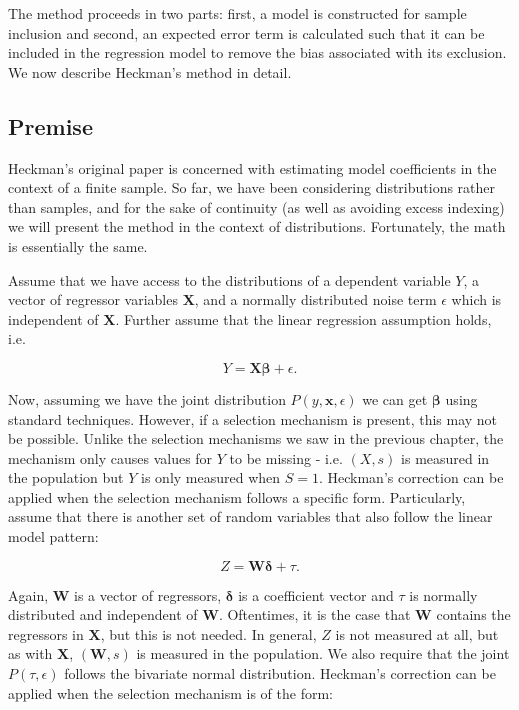 \documentclass[12pt,twoside]{reedthesis}
\theoremstyle{definition}
\begin{document}
The method proceeds in two parts: first, a model is constructed for sample inclusion and second, an expected error term is calculated such that it can be included in the regression model to remove the bias associated with its exclusion. We now describe Heckman's method in detail.

\subsection{Premise}

Heckman's original paper is concerned with estimating model coefficients in the context of a finite sample. So far, we have been considering distributions rather than samples, and for the sake of continuity (as well as avoiding excess indexing) we will present the method in the context of distributions. Fortunately, the math is essentially the same.

Assume that we have access to the distributions of a dependent variable $Y$, a vector of regressor variables $\mathbf{X}$, and a normally distributed noise term $\epsilon$ which is independent of $\mathbf{X}$. Further assume that the linear regression assumption holds, i.e.

$$Y = \mathbf{X} \boldsymbol{\beta} + \epsilon.$$

Now, assuming we have the joint distribution $P(y, \mathbf{x}, \epsilon)$ we can get $\mathbf{\beta}$ using standard techniques. However, if a selection mechanism is present, this may not be possible. Unlike the selection mechanisms we saw in the previous chapter, the mechanism only causes values for $Y$ to be missing - i.e. $(X, s)$ is measured in the population but $Y$ is only measured when $S = 1$. Heckman's correction can be applied when the selection mechanism follows a specific form. Particularly, assume that there is another set of random variables that also follow the linear model pattern: 

$$Z = \mathbf{W} \boldsymbol{\delta} + \tau.$$

Again, $\mathbf{W}$ is a vector of regressors, $\boldsymbol{\delta}$ is a coefficient vector and $\tau$ is normally distributed and independent of $\mathbf{W}$. Oftentimes, it is the case  that $\mathbf{W}$ contains the regressors in $\mathbf{X}$, but this is not needed. In general, $Z$ is not measured at all, but as with $\mathbf{X}$, $(\mathbf{W}, s)$ is measured in the population. We also require that the joint $P(\tau, \epsilon)$ follows the bivariate normal distribution. Heckman's correction can be applied when the selection mechanism is of the form:
\end{document}
